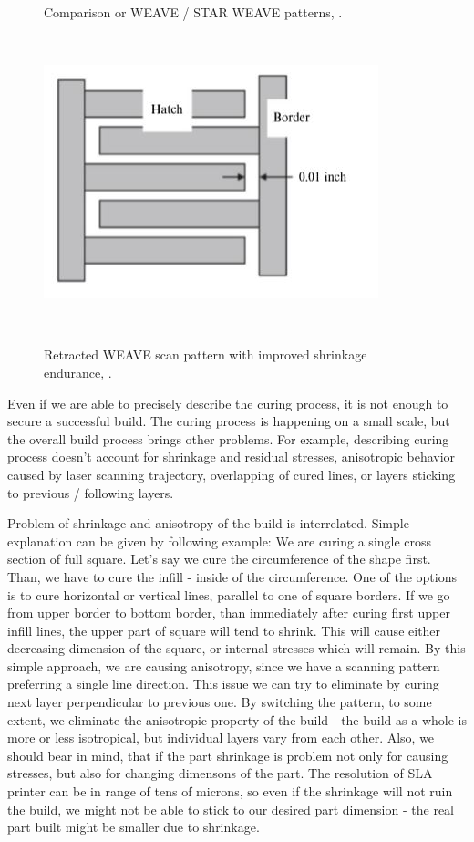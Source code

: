 \documentclass[a4paper, twoside, 11pt]{report}
\begin{document}
\begin{figure}[b!]
\begin{minipage}[t]{0.45\textwidth}
    \caption{Comparison or WEAVE / STAR WEAVE patterns, \cite[p. 88]{AMT}.}
  \end{minipage}
  \\[10pt]
  \begin{minipage}[t]{\textwidth}
  \centering
  \includegraphics[scale=0.8]{retractedWeave}
  \caption{Retracted WEAVE scan pattern with improved shrinkage endurance, \cite[p. 90]{AMT}.}
  \end{minipage}
  \\[20pt]
\end{figure}
%
Even if we are able to precisely describe the curing process, it is not enough to secure a successful build. The curing process is happening on a small scale, but the overall build process brings other problems. For example, describing curing process doesn't account for shrinkage and residual stresses, anisotropic behavior caused by laser scanning trajectory, overlapping of cured lines, or layers sticking to previous / following layers.
	
	Problem of shrinkage and anisotropy of the build is interrelated. Simple explanation can be given by following example: We are curing a single cross section of full square. Let's say we cure the circumference of the shape first. Than, we have to cure the infill - inside of the circumference. One of the options is to cure horizontal or vertical lines, parallel to one of square borders. If we go from upper border to bottom border, than immediately after curing first upper infill lines, the upper part of square will tend to shrink. This will cause either decreasing dimension of the square, or internal stresses which will remain.  By this simple approach, we are causing anisotropy, since we have a scanning pattern preferring a single line direction. This issue we can try to eliminate by curing next layer perpendicular to previous one. By switching the pattern, to some extent, we eliminate the anisotropic property of the build - the build as a whole is more or less isotropical, but individual layers vary from each other. Also, we should bear in mind, that if the part shrinkage is problem not only for causing stresses, but also for changing dimensons of the part. The resolution of SLA printer can be in range of tens of microns, so even if the shrinkage will not ruin the build, we might not be able to stick to our desired part dimension - the real part built might be smaller due to shrinkage.
	
\end{document}
